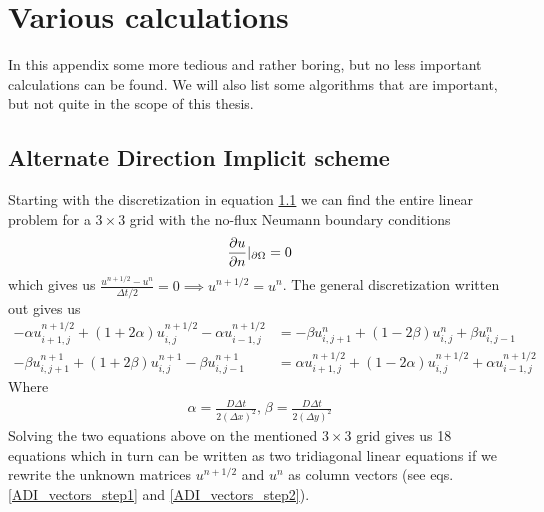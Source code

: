 \section{Various calculations}

In this appendix some more tedious and rather boring, but no less important calculations can be found. 
We will also list some algorithms that are important, but not quite in the scope of this thesis.

\subsection{Alternate Direction Implicit scheme}
Starting with the discretization in equation \ref{} we can find the entire linear problem for a $3\times3$ grid with the no-flux Neumann boundary conditions
\begin{equation*}
 \frac{\partial u}{\partial n}|_{\partial\Omega} = 0
\end{equation*}
which gives us $\frac{u^{n+1/2}-u^n}{\Delta t/2} = 0 \implies u^{n+1/2}=u^n$.
The general discretization written out gives us
\begin{align*}
 -\alpha u_{i+1,j}^{n+1/2} +(1+2\alpha)u_{i,j}^{n+1/2} -\alpha u_{i-1,j}^{n+1/2} &= -\beta u_{i,j+1}^{n}+(1-2\beta)u_{i,j}^{n} +\beta u_{i,j-1}^{n} \\
 -\beta u_{i,j+1}^{n+1} +(1+2\beta)u_{i,j}^{n+1} -\beta u_{i,j-1}^{n+1} &=\alpha u_{i+1,j}^{n+1/2} +(1-2\alpha)u_{i,j}^{n+1/2} +\alpha u_{i-1,j}^{n+1/2}
\end{align*}
Where 
\begin{align*}
 \alpha = \frac{D\Delta t}{2(\Delta x)^2}\text{,}\; \beta = \frac{D\Delta t}{2(\Delta y)^2}
\end{align*}
Solving the two equations above on the mentioned $3\times3$ grid gives us 18 equations which in turn can be written as two tridiagonal linear equations if we rewrite the unknown matrices $u^{n+1/2}$ and $u^n$ as column vectors (see eqs. \ref{ADI_vectors_step1} and \ref{ADI_vectors_step2}). 

